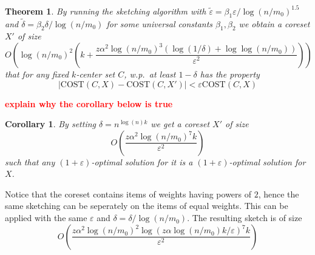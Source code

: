 \documentclass[11pt]{article}
\newtheorem{theorem} {Theorem}
\newtheorem{corollary} {Corollary}
\newcommand{\eps}{\varepsilon}
\newcommand{\note}[1]{\textbf{\textcolor{red}{#1}}}
\newcommand{\cost}{\text{COST}}
\newcommand{\N}{{\cal N}}
\begin{document}
\begin{theorem}
By running the sketching algorithm with $\tilde{\eps} = \beta_1 \eps/\log(n/m_0)^{1.5}$ and $\tilde{\delta} = \beta_2 \delta / \log(n/m_0)$ for some universal constants $\beta_1,\beta_2$ we obtain a coreset $X'$ of size 
$$ O\left( \log(n/m_0)^2 \left( k+\frac{ z \alpha^2 \log(n/m_0)^3 \left(\log(1/\delta)+\log\log(n/m_0) \right)}{\eps^2} \right) \right) $$
that for any fixed $k$-center set $C$, w.p.\ at least $1-\delta$ has the property 
$$ \left| \cost(C,X) - \cost(C,X') \right| < \eps \cost(C,X)$$
\end{theorem}

\note{explain why the corollary below is true}
\begin{corollary}
By setting $\delta = n^{\log(n)k}$ we get a coreset $X'$ of size
$$ O\left( \frac{ z \alpha^2 \log(n/m_0)^7 k }{\eps^2} \right)  $$
such that any $(1+\eps)$-optimal solution for it is a $(1+\eps)$-optimal solution for $X$.
\end{corollary}

Notice that the coreset contains items of weights having powers of $2$, hence the same sketching can be seperately on the items of equal weights. This can be applied with the same $\eps$ and $\delta = \delta/\log(n/m_0)$. The resulting sketch is of size
$$ O\left( \frac{ z \alpha^2 \log(n/m_0)^2 \log\left(z \alpha \log(n/m_0) k /\eps \right)^7 k }{\eps^2} \right)  $$

%
\end{document}
